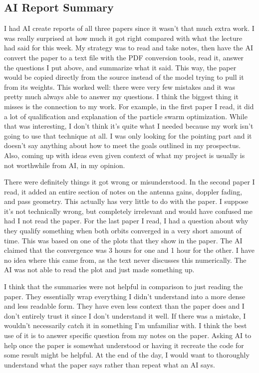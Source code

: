 \subsection{AI Report Summary} 

I had AI create reports of all three papers since it wasn't that much extra work. I was really surprised at how much it got right compared with what the lecture had said for this week. My strategy was to read and take notes, then have the AI convert the paper to a text file with the PDF conversion tools, read it, answer the questions I put above, and summarize what it said. This way, the paper would be copied directly from the source instead of the model trying to pull it from its weights. This worked well: there were very few mistakes and it was pretty much always able to answer my questions. I think the biggest thing it misses is the connection to my work. For example, in the first paper I read, it did a lot of qualification and explanation of the particle swarm optimization. While that was interesting, I don't think it's quite what I needed because my work isn't going to use that technique at all. I was only looking for the pointing part and it doesn't say anything about how to meet the goals outlined in my prospectus. Also, coming up with ideas even given context of what my project is usually is not worthwhile from AI, in my opinion. 

There were definitely things it got wrong or misunderstood. In the second paper I read, it added an entire section of notes on the antenna gains, doppler fading, and pass geometry. This actually has very little to do with the paper. I suppose it's not technically wrong, but completely irrelevant and would have confused me had I not read the paper. For the last paper I read, I had a question about why they qualify something when both orbits converged in a very short amount of time. This was based on one of the plots that they show in the paper. The AI claimed that the convergence was 3 hours for one and 1 hour for the other. I have no idea where this came from, as the text never discusses this numerically. The AI was not able to read the plot and just made something up.

I think that the summaries were not helpful in comparison to just reading the paper. They essentially wrap everything I didn't understand into a more dense and less readable form. They have even less context than the paper does and I don't entirely trust it since I don't understand it well. If there was a mistake, I wouldn't necessarily catch it in something I'm unfamiliar with. I think the best use of it is to answer specific question from my notes on the paper. Asking AI to help once the paper is somewhat understood or having it recreate the code for some result might be helpful. At the end of the day, I would want to thoroughly understand what the paper says rather than repeat what an AI says.


